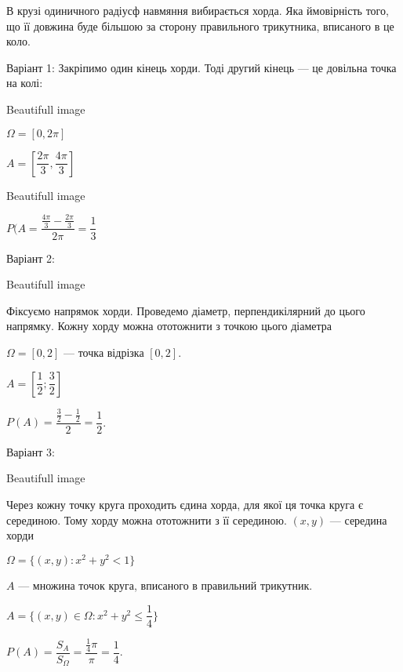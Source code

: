 \begin{problem}    
    В крузі одиничного радіусф навмяння вибирається хорда.
    Яка ймовірність того, що її довжина буде більшою за 
    сторону правильного трикутника, вписаного в це коло.
\end{problem}
\begin{solution}
    Варіант 1: Закріпимо один кінець хорди. Тоді другий
    кінець --- це довільна точка на колі:

    \begin{center}
        Beautifull image
    \end{center}

    $\Omega = [0, 2\pi]$

    $A = [\dfrac{2\pi}{3}, \dfrac{4\pi}{3}]$

    \begin{center}
        Beautifull image
    \end{center}

    $P(A = \dfrac{\frac{4\pi}{3}-\frac{2\pi}{3}}{2\pi} =\dfrac{1}{3}$

    Варіант 2:
    
    \begin{center}
        Beautifull image
    \end{center}
    
    Фіксуємо напрямок хорди. Проведемо діаметр,
    перпендикілярний до цього напрямку. Кожну хорду можна
    ототожнити з точкою цього діаметра

    $\Omega = [0, 2]$ --- точка відрізка $[0, 2]$.

    $A = [\dfrac{1}{2}; \dfrac{3}{2}]$

    $P(A) = \dfrac{\frac{3}{2}-\frac{1}{2}}{2} = \dfrac{1}{2}$.

    Варіант 3:
    
    \begin{center}
        Beautifull image
    \end{center}

    Через кожну точку круга проходить єдина
    хорда, для якої ця точка круга є серединою. Тому хорду
    можна ототожнити з її серединою. $(x, y)$ --- середина хорди

    $\Omega = \{(x, y): x^2 + y^2 < 1\}$

    $A$ --- множина точок круга, вписаного в правильний трикутник.

    $A = \{(x, y) \in \Omega: x^2 + y^2 \leqslant \dfrac{1}{4}\}$

    $P(A) = \dfrac{S_A}{S_{\Omega}} = \dfrac{\frac{1}{4}\pi}{\pi} = \dfrac{1}{4}.$
\end{solution}



